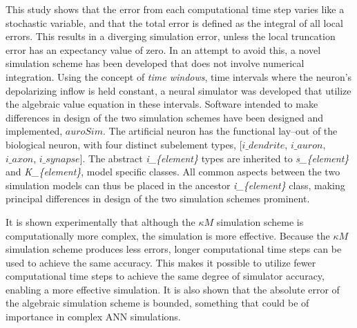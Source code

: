 This study shows that the error from each computational time step varies like a stochastic variable, and that the total error is defined as the integral of all local errors. 
This results in a diverging simulation error, unless the local truncation error has an expectancy value of zero.
In an attempt to avoid this, a novel simulation scheme has been developed that does not involve numerical integration.
Using the concept of \emph{time windows}, time intervals where the neuron's depolarizing inflow is held constant, a neural simulator was developed that utilize the algebraic value equation in these intervals.
Software intended to make differences in design of the two simulation schemes have been designed and implemented, $auroSim$.
The artificial neuron has the functional lay--out of the biological neuron, with four distinct subelement types, [$i\_dendrite$, $i\_auron$, $i\_axon$, $i\_synapse$].
The abstract \emph{i\_\{element\}} types are inherited to \emph{s\_\{element\}} and \emph{K\_\{element\}}, model specific classes.
All common aspects between the two simulation models can thus be placed in the ancestor \emph{i\_\{element\}} class, making principal differences in design of the two simulation schemes prominent.

It is shown experimentally that although the $\kappa M$ simulation scheme is computationally more complex, the simulation is more effective. %
Because the $\kappa M$ simulation scheme produces less errors, longer computational time steps can be used to achieve the same accuracy.
This makes it possible to utilize fewer computational time steps to achieve the same degree of simulator accuracy, enabling a more effective simulation.
It is also shown that the absolute error of the algebraic simulation scheme is bounded, something that could be of importance in complex ANN simulations.




